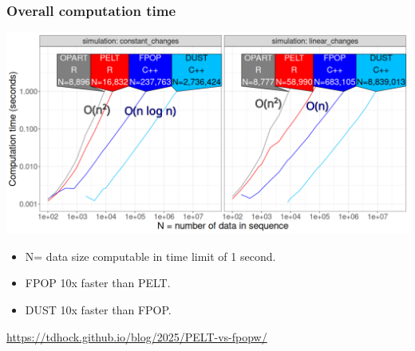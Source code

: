 \documentclass{beamer}
\begin{document}
\begin{frame}
  \frametitle{Overall computation time}
  \includegraphics[width=\textwidth]{figure-pred-seconds-O.png}

  \begin{itemize}
  \item N= data size computable in time limit of 1 second.
  \item FPOP 10x faster than PELT.
  \item DUST 10x faster than FPOP.
  \end{itemize}

  \url{https://tdhock.github.io/blog/2025/PELT-vs-fpopw/}
\end{frame}
\end{document}
